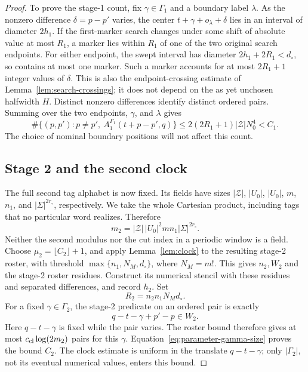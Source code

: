 \begin{proof}
To prove the stage-1 count, fix \(\gamma\in\Gamma_1\) and a boundary
label \(\lambda\).  As the nonzero difference \(\delta=p-p'\)
varies, the center
\(t+\gamma+o_\lambda+\delta\) lies in an interval of diameter
\(2h_1\).  If the first-marker search changes under some shift of
absolute value at most \(R_1\), a marker lies within \(R_1\) of one
of the two original search endpoints.  For either endpoint, the
swept interval has diameter \(2h_1+2R_1<d_\circ\), so contains at
most one marker.  Such a marker accounts for at most \(2R_1+1\)
integer values of \(\delta\).  This is also the endpoint-crossing
estimate of Lemma~\ref{lem:search-crossings}; it does not depend on
the as yet unchosen halfwidth \(H\).  Distinct nonzero differences
identify distinct ordered pairs.  Summing over the two endpoints,
\(\gamma\), and \(\lambda\) gives
\[
 \#\{(p,p'):p\ne p',\ A_1^{\Gamma_1}(t+p-p',q)\}
 \le2(2R_1+1)|\mathcal Z|N_0^4<C_1.
\]
The choice of nominal boundary positions will not affect this count.

\subsection*{Stage 2 and the second clock}
The full second tag alphabet is now fixed.  Its fields have sizes
\( |\mathcal Z|\), \(|U_0|\), \(|U_0|\), \(m\), \(n_1\), and
\(|\Sigma|^{2r_\circ}\), respectively.  We take the whole Cartesian
product, including tags that no particular word realizes.  Therefore
\begin{equation}\label{eq:parameter-second-tags}
 m_2=|\mathcal Z|\,|U_0|^2m n_1|\Sigma|^{2r_\circ}.
\end{equation}
Neither the second modulus nor the cut index in a periodic window is
a field.  Choose \(\mu_2=\lfloor C_2\rfloor+1\), and apply
Lemma~\ref{lem:clock} to the resulting stage-2 roster, with threshold
\(\max\{n_1,N_M,d_\circ\}\), where \(N_M=m!\).  This gives
\(n_2,W_2\) and the stage-2 roster residues.  Construct its numerical
stencil with these residues and separated differences, and record
\(h_2\).  Set
\begin{equation}\label{eq:parameter-r2}
 R_2=n_2n_1N_Md_\circ.
\end{equation}
For a fixed \(\gamma\in\Gamma_2\), the stage-2 predicate on an
ordered pair is exactly
\[
 q-t-\gamma+p'-p\in W_2.
\]
Here \(q-t-\gamma\) is fixed while the pair varies.  The roster bound
therefore gives at most \(c_{\rm cl}\log(2m_2)\) pairs for this
\(\gamma\).  Equation~\eqref{eq:parameter-gamma-size} proves the bound
\(C_2\). The clock estimate is uniform in the translate \(q-t-\gamma\);
only \(|\Gamma_2|\), not its eventual numerical values, enters this bound.


\end{proof}
